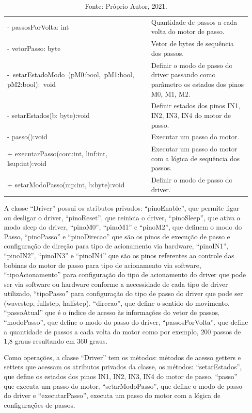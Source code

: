 \begin{table}[!htb]
\begin{tabular}{p{8cm}p{6cm}}
        - passosPorVolta: int & Quantidade de passos a cada volta do motor de passo.\\
        - vetorPasso: byte & Vetor de bytes de sequência dos passos.\\
        -~setarEstadoModo~(pM0:bool,~pM1:bool, pM2:bool):~void & Definir o modo de passo do driver passando como parâmetro os estados dos pinos M0, M1, M2.\\
        - setarEstados(b: byte):void & Definir estados dos pinos IN1, IN2, IN3, IN4 do motor de passo.\\
        - passo():void & Executar um passo do motor.\\
        + executarPasso(cont:int, linf:int, lsup:int):void & Executar um passo do motor com a lógica de sequência dos passos.\\
        + setarModoPasso(mp:int, b:byte):void & Definir o modo de passo do driver.\\
        \hline       
    \end{tabular}
    \caption*{Fonte: Próprio Autor, 2021.}
    \label{tab:classedriver}
\end{table}

A classe “Driver” possui os atributos privados: “pinoEnable”, que permite ligar ou desligar o driver, 
“pinoReset”, que reinicia o driver, “pinoSleep”, que ativa o modo sleep do driver, “pinoM0”, “pinoM1” 
e “pinoM2”, que definem o modo do Passo, “pinoPasso” e “pinoDirecao” que são os pinos de execução de 
passo e configuração de direção para tipo de acionamento via hardware, “pinoIN1”, “pinoIN2”, “pinoIN3” 
e “pinoIN4” que são os pinos referentes ao controle das bobinas do motor de passo para tipo de acionamento 
via software, “tipoAcionamento” para configuração do tipo de acionamento do driver que pode ser via software 
ou hardware conforme a necessidade de cada tipo de driver utilizado, “tipoPasso” para configuração do tipo 
de passo do driver que pode ser (wavestep, fullstep, halfstep), “direcao”, que define o sentido do movimento, 
“passoAtual” que é o índice de acesso às informações do vetor de passos, “modoPasso”, que define o modo do 
passo do driver, “passosPorVolta”, que define a quantidade de passos a cada volta do motor como por exemplo, 
200 passos de 1,8 graus resultando em 360 graus. 

Como operações, a classe “Driver” tem os métodos: métodos de acesso getters e setters que acessam os 
atributos privados da classe, os métodos: “setarEstados”, que define os estados dos pinos IN1, IN2, IN3, 
IN4 do motor de passo, “passo” que executa um passo do motor, “setarModoPasso”, que define o modo de passo 
do driver e “executarPasso”, executa um passo do motor com a lógica de configurações de passos.

